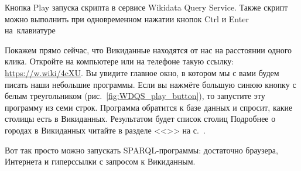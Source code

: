 \begin{marginfigure}[0.0cm]
{
\setlength{\fboxsep}{0pt}%
\setlength{\fboxrule}{1pt}%
}
\caption[Выполнение скрипта в сервисе Wikidata Query Service.]{Кнопка Play запуска скрипта в сервисе Wikidata Query Service. Также скрипт можно выполнить при одновременном нажатии кнопок Ctrl и Enter на~клавиатуре}%
\label{fig:WDQS_play_button}%
\end{marginfigure}%
Покажем прямо сейчас, что Викиданные находятся от нас на расстоянии одного клика.
Откройте на компьютере или на телефоне такую ссылку: 
\url{https://w.wiki/4cXU}. 
Вы увидите главное окно, в котором мы с вами будем писать наши небольшие программы. 
Если вы нажмёте большую синюю кнопку с белым треугольником (рис.~\ref{fig:WDQS_play_button}), 
то запустите эту программу из семи строк. 
Программа обратится к базе данных 
и спросит, какие столицы есть в Викиданных. Результатом будет список столиц %
%
Подробнее о городах в Викиданных читайте в разделе <<>> на с.~\pageref{ch:city}. 

Вот так просто можно запускать SPARQL-программы: достаточно браузера, 
Интернета и гиперссылки с запросом к Викиданным.



